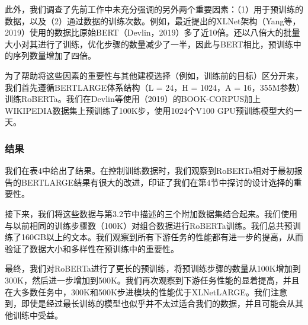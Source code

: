\documentclass[lang=cn,11pt,a4paper,twocolumn]{elegantpaper}
\begin{document}
此外，我们调查了先前工作中未充分强调的另外两个重要因素：（1）用于预训练的数据，以及（2）通过数据的训练次数。例如，最近提出的XLNet架构（Yang等，2019）使用的数据比原始BERT（Devlin，2019）多了近10倍。还以八倍大的批量大小对其进行了训练，优化步骤的数量减少了一半，因此与BERT相比，预训练中的序列数量增加了四倍。

为了帮助将这些因素的重要性与其他建模选择（例如，训练前的目标）区分开来，我们首先遵循BERTLARGE体系结构（L = 24，H = 1024，A = 16，355M参数）训练RoBERTa。我们在Devlin等使用（2019）的BOOK-CORPUS加上WIKIPEDIA数据集上预训练了100K步，使用1024个V100 GPU预训练模型大约一天。

\subsubsection*{结果}

我们在表4中给出了结果。在控制训练数据时，我们观察到RoBERTa相对于最初报告的BERTLARGE结果有很大的改进，印证了我们在第4节中探讨的设计选择的重要性。

接下来，我们将这些数据与第3.2节中描述的三个附加数据集结合起来。我们使用与以前相同的训练步骤数（100K）对组合数据进行RoBERTa训练。我们总共预训练了160GB以上的文本。我们观察到所有下游任务的性能都有进一步的提高，从而验证了数据大小和多样性在预训练中的重要性。

最终，我们对RoBERTa进行了更长的预训练，将预训练步骤的数量从100K增加到300K，然后进一步增加到500K。我们再次观察到下游任务性能的显着提高，并且在大多数任务中，300K和500K步进模块的性能优于XLNetLARGE。我们注意到，即使是经过最长训练的模型也似乎并不太过适合我们的数据，并且可能会从其他训练中受益。
\end{document}
